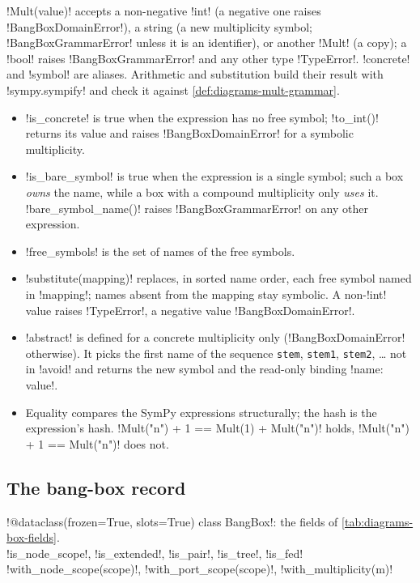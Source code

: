 \py!Mult(value)! accepts a non-negative \py!int! (a negative one raises \py!BangBoxDomainError!), a string (a new multiplicity symbol; \py!BangBoxGrammarError! unless it is an identifier), or another \py!Mult! (a copy); a \py!bool! raises \py!BangBoxGrammarError! and any other type \py!TypeError!. \py!concrete! and \py!symbol! are aliases. Arithmetic and substitution build their result with \py!sympy.sympify! and check it against \cref{def:diagrams-mult-grammar}.

\begin{itemize}
\item \py!is_concrete! is true when the expression has no free symbol; \py!to_int()! returns its value and raises \py!BangBoxDomainError! for a symbolic multiplicity.
\item \py!is_bare_symbol! is true when the expression is a single symbol; such a box \emph{owns} the name, while a box with a compound multiplicity only \emph{uses} it. \py!bare_symbol_name()! raises \py!BangBoxGrammarError! on any other expression.
\item \py!free_symbols! is the set of names of the free symbols.
\item \py!substitute(mapping)! replaces, in sorted name order, each free symbol named in \py!mapping!; names absent from the mapping stay symbolic. A non-\py!int! value raises \py!TypeError!, a negative value \py!BangBoxDomainError!.
\item \py!abstract! is defined for a concrete multiplicity only (\py!BangBoxDomainError! otherwise). It picks the first name of the sequence \texttt{stem}, \texttt{stem1}, \texttt{stem2}, \ldots{} not in \py!avoid! and returns the new symbol and the read-only binding \py!{name: value}!.
\item Equality compares the SymPy expressions structurally; the hash is the expression's hash. \py!Mult("n") + 1 == Mult(1) + Mult("n")! holds, \py!Mult("n") + 1 == Mult("n")! does not.
\end{itemize}

\subsection{The bang-box record}\label{sec:diagrams-box-record}

\begin{signature}
\py!@dataclass(frozen=True, slots=True) class BangBox!: the fields of \cref{tab:diagrams-box-fields}.\\
\quad \py!is_node_scope!, \py!is_extended!, \py!is_pair!, \py!is_tree!, \py!is_fed!\\
\quad \py!with_node_scope(scope)!, \py!with_port_scope(scope)!, \py!with_multiplicity(m)!
\end{signature}

